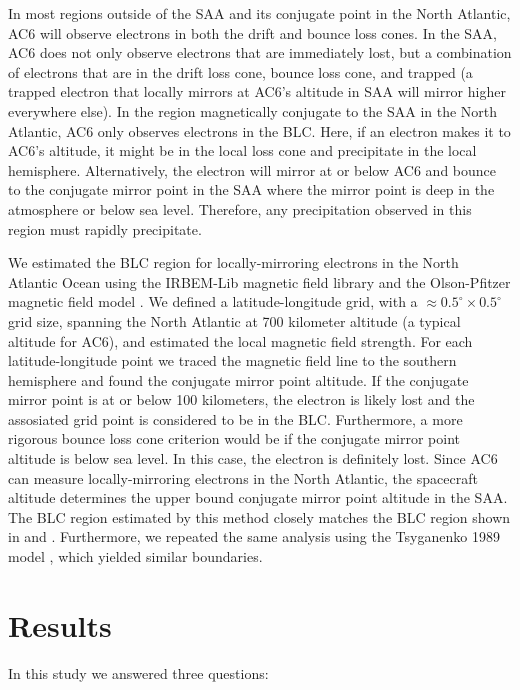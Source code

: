 \documentclass[draft]{agujournal2019}
\begin{document}
In most regions outside of the SAA and its conjugate point in the North Atlantic, AC6 will observe electrons in both the drift and bounce loss cones. In the SAA, AC6 does not only observe electrons that are immediately lost, but a combination of electrons that are in the drift loss cone, bounce loss cone, and trapped (a trapped electron that locally mirrors at AC6's altitude in SAA will mirror higher everywhere else). In the region magnetically conjugate to the SAA in the North Atlantic, AC6 only observes electrons in the BLC. Here, if an electron makes it to AC6's altitude, it might be in the local loss cone and precipitate in the local hemisphere. Alternatively, the electron will mirror at or below AC6 and bounce to the conjugate mirror point in the SAA where the mirror point is deep in the atmosphere or below sea level. Therefore, any precipitation observed in this region must rapidly precipitate. 

We estimated the BLC region for locally-mirroring electrons in the North Atlantic Ocean using the IRBEM-Lib magnetic field library and the Olson-Pfitzer magnetic field model \cite{irbem, Olson1982}. We defined a latitude-longitude grid, with a $\approx 0.5^\circ \times 0.5^\circ$ grid size, spanning the North Atlantic at 700 kilometer altitude (a typical altitude for AC6), and estimated the local magnetic field strength. For each latitude-longitude point we traced the magnetic field line to the southern hemisphere and found the conjugate mirror point altitude. If the conjugate mirror point is at or below 100 kilometers, the electron is likely lost and the assosiated grid point is considered to be in the BLC. Furthermore, a more rigorous bounce loss cone criterion would be if the conjugate mirror point altitude is below sea level. In this case, the electron is definitely lost. Since AC6 can measure locally-mirroring electrons in the North Atlantic, the spacecraft altitude determines the upper bound conjugate mirror point altitude in the SAA. The BLC region estimated by this method closely matches the BLC region shown in  and . Furthermore, we repeated the same analysis using the Tsyganenko 1989 model \cite{Tsyganenko1989}, which yielded similar boundaries.

\section{Results} \label{results}
In this study we answered three questions:
\end{document}

